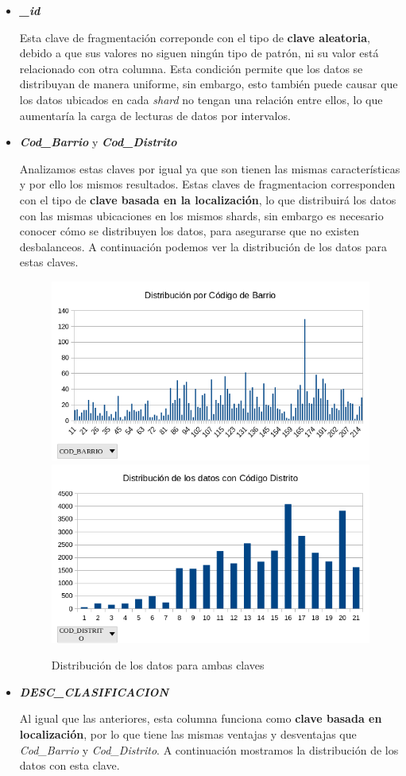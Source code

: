 \documentclass[]{article}
\begin{document}
\begin{itemize}
    \item \textbf{\textit{\_id}}
    
    Esta clave de fragmentación correponde con el tipo de \textbf{clave aleatoria}, debido a que sus valores no siguen ningún tipo de patrón, ni su valor está relacionado con otra columna. Esta condición permite que los datos se distribuyan de manera uniforme, sin embargo, esto también puede causar que los datos ubicados en cada \textit{shard} no tengan una relación entre ellos, lo que aumentaría la carga de lecturas de datos por intervalos.

    \item \textbf{\textit{Cod\_Barrio}} y \textbf{\textit{Cod\_Distrito}}
    
    Analizamos estas claves por igual ya que son tienen las mismas características y por ello los mismos resultados. Estas claves de fragmentacion corresponden con el tipo de \textbf{clave basada en la localización}, lo que distribuirá los datos con las mismas ubicaciones en los mismos shards, sin embargo es necesario conocer cómo se distribuyen los datos, para asegurarse que no existen desbalanceos. A continuación podemos ver la distribución de los datos para estas claves.

    \begin{figure}[H]
        \includegraphics[width=0.45\linewidth]{Distribucion_Cod_Barrio.png}
        \includegraphics[width=0.45\linewidth]{Distribucion_Cod_Distrito.png}
        \caption{Distribución de los datos para ambas claves}
    \end{figure}

    \item \textbf{\textit{DESC\_CLASIFICACION}}
    
    Al igual que las anteriores, esta columna funciona como \textbf{clave basada en localización}, por lo que tiene las mismas ventajas y desventajas que \textit{Cod\_Barrio} y \textit{Cod\_Distrito}. A continuación mostramos la distribución de los datos con esta clave.


\end{itemize}
\end{document}
